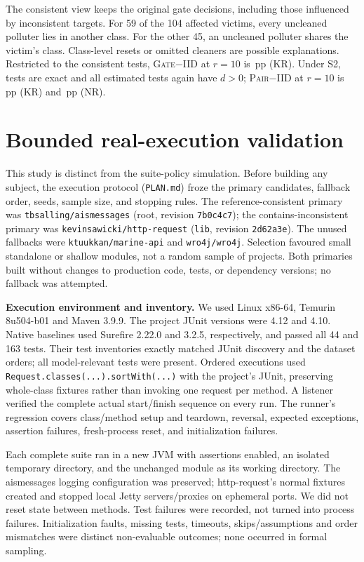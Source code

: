 \documentclass[11pt,a4paper]{article}
\newcommand{\pp}{\,pp}
\newcommand{\IIDp}{\textup{\textsc{IID}}}
\newcommand{\PAIRp}{\textup{\textsc{Pair}}}
\newcommand{\GATEp}{\textup{\textsc{Gate}}}
\theoremstyle{definition}\newtheorem{definition}[theorem]{Definition}
\theoremstyle{remark}\newtheorem{remark}[theorem]{Remark}
\theoremstyle{definition}\newtheorem{xexample}[xtheorem]{Example}\theoremstyle{plain}
\begin{document}
The consistent view keeps the original gate decisions, including those influenced by inconsistent targets. For 59 of the 104 affected victims, every uncleaned polluter lies in another class. For the other 45, an uncleaned polluter shares the victim's class. Class-level resets or omitted cleaners are possible explanations. Restricted to the \NConsistent{} consistent tests, \GATEp{}$-$\IIDp{} at $r=10$ is \KRConsGateMinusIidTen\pp{} (KR). Under S2, \NExactAlt{} tests are exact and all \NMCAlt{} estimated tests again have $d>0$; \PAIRp{}$-$\IIDp{} at $r=10$ is \KRPairMinusIidTenAlt\pp{} (KR) and \NRPairMinusIidTenAlt\pp{} (NR).

\clearpage
\section{Bounded real-execution validation}
This study is distinct from the suite-policy simulation. Before building any subject,
the execution protocol (\texttt{PLAN.md}) froze the primary candidates, fallback order,
seeds, sample size, and stopping rules. The reference-consistent primary was
\texttt{tbsalling/aismessages} (root, revision \texttt{7b0c4c7}); the
contains-inconsistent primary was \texttt{kevinsawicki/http-request}
(\texttt{lib}, revision \texttt{2d62a3e}). The unused fallbacks were
\texttt{ktuukkan/marine-api} and \texttt{wro4j/wro4j}. Selection favoured small
standalone or shallow modules, not a random sample of projects. Both primaries
built without changes to production code, tests, or dependency versions; no fallback was attempted.

\textbf{Execution environment and inventory.} We used Linux x86-64, Temurin
8u504-b01 and Maven 3.9.9. The project JUnit versions were 4.12 and 4.10.
Native baselines used Surefire 2.22.0 and 3.2.5, respectively, and passed all 44
and 163 tests. Their test inventories exactly matched JUnit discovery and the
dataset orders; all model-relevant tests were present. Ordered executions used
\texttt{Request.classes(...).sortWith(...)} with the project's JUnit, preserving
whole-class fixtures rather than invoking one request per method. A listener
verified the complete actual start/finish sequence on every run. The runner's
regression covers class/method setup and teardown, reversal, expected exceptions,
assertion failures, fresh-process reset, and initialization failures.

Each complete suite ran in a new JVM with assertions enabled, an isolated temporary
directory, and the unchanged module as its working directory. The aismessages
logging configuration was preserved; http-request's normal fixtures created and
stopped local Jetty servers/proxies on ephemeral ports. We did not reset state
between methods. Test failures were recorded, not turned into process failures.
Initialization faults, missing tests, timeouts, skips/assumptions and order
mismatches were distinct non-evaluable outcomes; none occurred in formal sampling.
\end{document}
